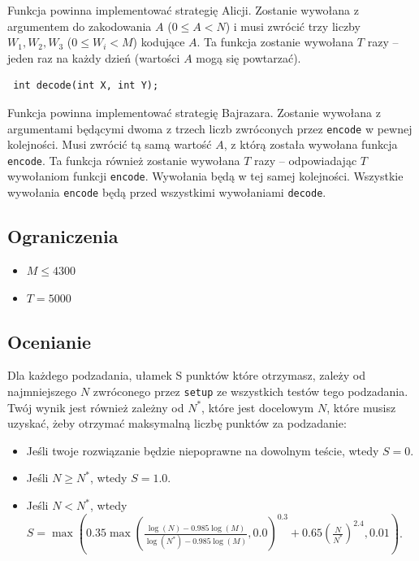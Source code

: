 \documentclass[12pt]{article}
\begin{document}
Funkcja powinna implementować strategię Alicji. Zostanie wywołana z argumentem do zakodowania $A$ ($0 \leq A < N$) i musi zwrócić trzy liczby $W_1, W_2, W_3$ ($0 \leq W_i < M$) kodujące $A$. Ta funkcja zostanie wywołana $T$ razy -- jeden raz na każdy dzień (wartości $A$ mogą się powtarzać).

\begin{lstlisting}
 int decode(int X, int Y);
\end{lstlisting}

Funkcja powinna implementować strategię Bajrazara. Zostanie wywołana z argumentami będącymi dwoma z trzech liczb zwróconych przez \texttt{encode} w pewnej kolejności. Musi zwrócić tą samą wartość $A$, z którą została wywołana funkcja \texttt{encode}. Ta funkcja również zostanie wywołana $T$ razy -- odpowiadając $T$ wywołaniom funkcji \texttt{encode}. Wywołania będą w tej samej kolejności. Wszystkie wywołania \texttt{encode} będą przed wszystkimi wywołaniami \texttt{decode}.

\subsection{Ograniczenia}

\begin{itemize}
\item $M \leq 4300$
\item $T = 5000$
\end{itemize}

\subsection{Ocenianie}

Dla każdego podzadania, ułamek S punktów które otrzymasz, zależy od najmniejszego $N$ zwróconego przez \texttt{setup} ze wszystkich testów tego podzadania. Twój wynik jest również zależny od $N^*$, które jest docelowym $N$, które musisz uzyskać, żeby otrzymać maksymalną liczbę punktów za podzadanie:

\begin{itemize}
\item Jeśli twoje rozwiązanie będzie niepoprawne na dowolnym teście, wtedy $S = 0$.
\item Jeśli $N \geq N^*$, wtedy $S = 1.0$.
\item Jeśli $N < N^*$, wtedy $S = \max\left(0.35 \max\left(\frac{\log(N) - 0.985 \log(M)}{\log(N^*) - 0.985 \log(M)}, 0.0\right)^{0.3} + 0.65 \left(\frac{N}{N^*}\right)^{2.4}, 0.01\right)$.
\end{itemize}
\end{document}
